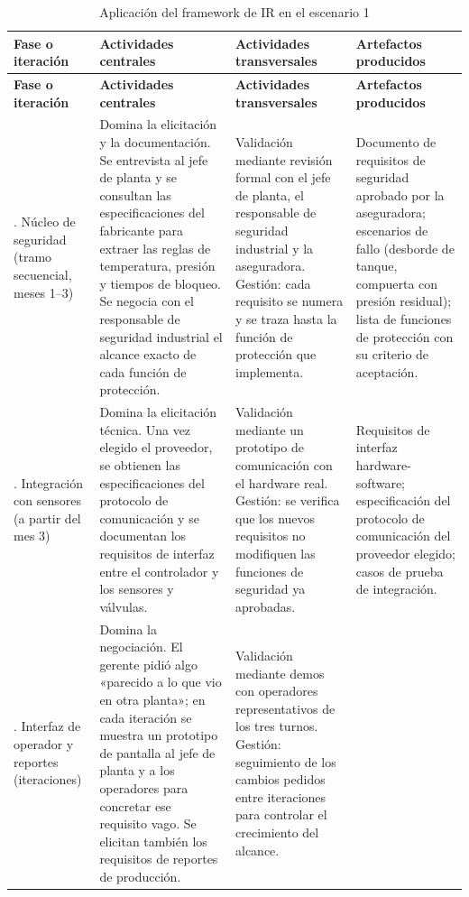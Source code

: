 \documentclass[12pt,a4paper]{article}
\begin{document}
\begingroup\scriptsize\setlength{\tabcolsep}{4pt}
\begin{longtable}{>{\raggedright\arraybackslash}p{2.0cm} >{\raggedright\arraybackslash}p{4.0cm} >{\raggedright\arraybackslash}p{4.0cm} >{\raggedright\arraybackslash}p{4.0cm}}
\caption{Aplicación del framework de IR en el escenario 1}\\
\toprule
\textbf{Fase o iteración} &
\textbf{Actividades centrales} &
\textbf{Actividades transversales} &
\textbf{Artefactos producidos} \\
\midrule
\endfirsthead
\toprule
\textbf{Fase o iteración} &
\textbf{Actividades centrales} &
\textbf{Actividades transversales} &
\textbf{Artefactos producidos} \\
\midrule
\endhead
1. Núcleo de seguridad (tramo secuencial, meses 1--3) &
Domina la elicitación y la documentación. Se entrevista al jefe de planta y se consultan las especificaciones del fabricante para extraer las reglas de temperatura, presión y tiempos de bloqueo. Se negocia con el responsable de seguridad industrial el alcance exacto de cada función de protección. &
Validación mediante revisión formal con el jefe de planta, el responsable de seguridad industrial y la aseguradora. Gestión: cada requisito se numera y se traza hasta la función de protección que implementa. &
Documento de requisitos de seguridad aprobado por la aseguradora; escenarios de fallo (desborde de tanque, compuerta con presión residual); lista de funciones de protección con su criterio de aceptación. \\
\midrule
2. Integración con sensores (a partir del mes 3) &
Domina la elicitación técnica. Una vez elegido el proveedor, se obtienen las especificaciones del protocolo de comunicación y se documentan los requisitos de interfaz entre el controlador y los sensores y válvulas. &
Validación mediante un prototipo de comunicación con el hardware real. Gestión: se verifica que los nuevos requisitos no modifiquen las funciones de seguridad ya aprobadas. &
Requisitos de interfaz hardware-software; especificación del protocolo de comunicación del proveedor elegido; casos de prueba de integración. \\
\midrule
3. Interfaz de operador y reportes (iteraciones) &
Domina la negociación. El gerente pidió algo «parecido a lo que vio en otra planta»; en cada iteración se muestra un prototipo de pantalla al jefe de planta y a los operadores para concretar ese requisito vago. Se elicitan también los requisitos de reportes de producción. &
Validación mediante demos con operadores representativos de los tres turnos. Gestión: seguimiento de los cambios pedidos entre iteraciones para controlar el crecimiento del alcance. &

\end{longtable}
\end{document}
